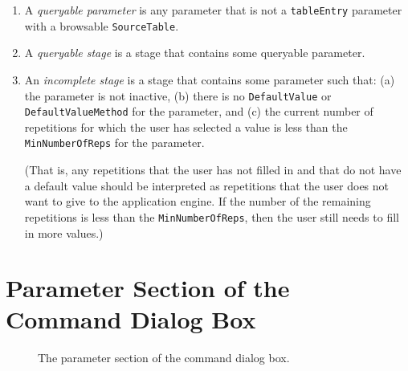 \documentclass[11pt]{article}
\begin{document}
\begin{enumerate}
  {\tt ParentValue} for this parameter.
\item A {\it queryable parameter} is any parameter
  that is not a {\tt tableEntry} parameter with
  a browsable {\tt SourceTable}.
\item A {\it queryable stage} is a stage that contains some
  queryable parameter.
\item An {\it incomplete stage} is a stage that contains some parameter
  such that: (a) the parameter is not inactive, (b) there is no
  {\tt DefaultValue} or {\tt DefaultValueMethod} for the parameter,
  and (c) the current number of repetitions for which the user has
  selected a value is less than the
  {\tt MinNumberOfReps} for the parameter.

  (That is, any repetitions that the user has not filled in and that
  do not have a default value should be interpreted as repetitions
  that the user does not want to give to the application engine.
  If the number of the remaining repetitions is less than the
  {\tt MinNumberOfReps}, then the user still needs to fill in more
  values.)
\end{enumerate}

\section{Parameter Section of the Command Dialog Box}

\begin{figure}

\centerline{\epsfxsize=5.5in }

\caption{
  The parameter section of the command dialog box.
}
\label{parameterSectionFig}
\end{figure}
\end{document}
